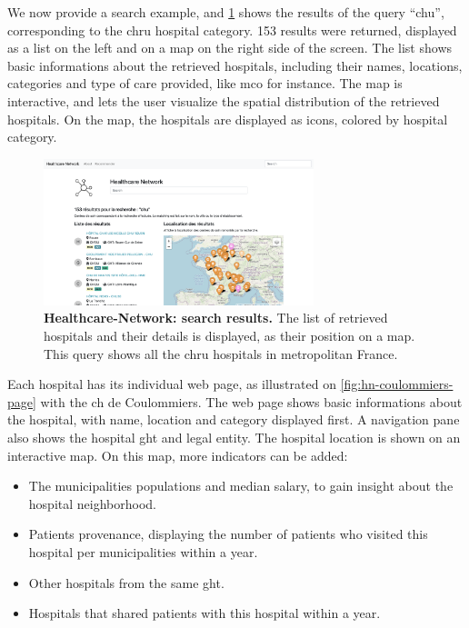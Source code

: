 We now provide a search example, and \cref{fig:hn-search} shows the results of the query ``chu'', corresponding to the \acf{chru} hospital category. 153 results were returned, displayed as a list on the left and on a map on the right side of the screen. The list shows basic informations about the retrieved hospitals, including their names, locations, categories and type of care provided, like \acf{mco} for instance. The map is interactive, and lets the user visualize the spatial distribution of the retrieved hospitals. On the map, the hospitals are displayed as icons, colored by hospital category.

\begin{figure}[H]
    \includegraphics[width=0.7\textwidth]{images/healthcare-network/search.png}
    \centering
    \caption{
        \textbf{Healthcare-Network: search results.} The list of retrieved hospitals and their details is displayed, as their position on a map. This query shows all the \ac{chru} hospitals in metropolitan France.
    }
    \label{fig:hn-search}
\end{figure}

Each hospital has its individual web page, as illustrated on \cref{fig:hn-coulommiers-page} with the \ac{ch} de Coulommiers. The web page shows basic informations about the hospital, with name, location and category displayed first. A navigation pane also shows the hospital \ac{ght} and legal entity. The hospital location is shown on an interactive map. On this map, more indicators can be added:

\begin{itemize}
    \item The municipalities populations and median salary, to gain insight about the hospital neighborhood.
    \item Patients provenance, displaying the number of patients who visited this hospital per municipalities within a year.
    \item Other hospitals from the same \ac{ght}.
    \item Hospitals that shared patients with this hospital within a year.
\end{itemize}

